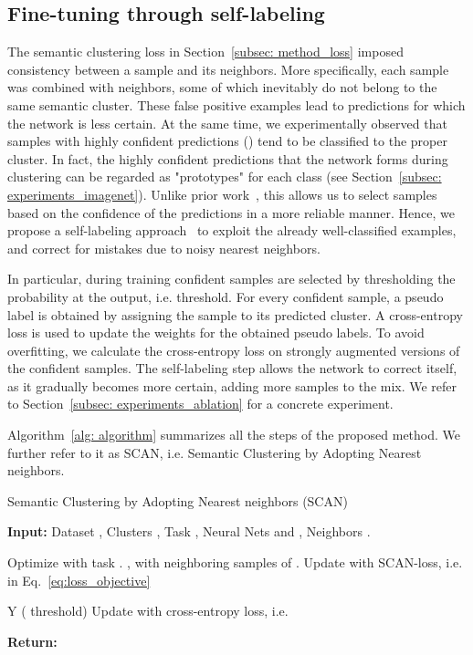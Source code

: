 \documentclass[runningheads]{llncs}
\begin{document}
\subsection{Fine-tuning through self-labeling}
\label{subsec: method_selflabeling}
The semantic clustering loss in Section~\ref{subsec: method_loss} imposed consistency between a sample and its neighbors. More specifically, each sample was combined with  neighbors, some of which inevitably do not belong to the same semantic cluster. These false positive examples lead to predictions for which the network is less certain. At the same time, we experimentally observed that samples with highly confident predictions () tend to be classified to the proper cluster. In fact, the highly confident predictions that the network forms during clustering can be regarded as "prototypes" for each class (see Section~\ref{subsec: experiments_imagenet}). Unlike prior work~\cite{DAC,DeepCluster,DEC}, this allows us to select samples based on the confidence of the predictions in a more reliable manner. Hence, we propose a self-labeling approach~\cite{scudder1965probability,mclachlan1975iterative,sohn2020fixmatch} to exploit the already well-classified examples, and correct for mistakes due to noisy nearest neighbors. 

In particular, during training confident samples are selected by thresholding the probability at the output, i.e.  threshold. For every confident sample, a pseudo label is obtained by assigning the sample to its predicted cluster. A cross-entropy loss is used to update the weights for the obtained pseudo labels. To avoid overfitting, we calculate the cross-entropy loss on strongly augmented versions of the confident samples. The self-labeling step allows the network to correct itself, as it gradually becomes more certain, adding more samples to the mix. We refer to Section~\ref{subsec: experiments_ablation} for a concrete experiment. 

Algorithm~\ref{alg: algorithm} summarizes all the steps of the proposed method. We further refer to it as SCAN, i.e. Semantic Clustering by Adopting Nearest neighbors.

\begin{algorithm}[t]
\small{
\caption{Semantic Clustering by Adopting Nearest neighbors (SCAN)}
\label{alg: algorithm}
\begin{algorithmic}[1]
\State \textbf{Input:} Dataset , Clusters , Task , Neural Nets  and , Neighbors .

\State Optimize  with task . 
\For{}
\State , with  neighboring samples of .
\EndFor
{} 
\State Update  with SCAN-loss, i.e.  in Eq.~\ref{eq:loss_objective}
\EndWhile 

 
\State Y  ( threshold)   
\State Update  with cross-entropy loss, i.e. 
\EndWhile

\State \textbf{Return:}  
\end{algorithmic}
}
\end{algorithm}
\end{document}
